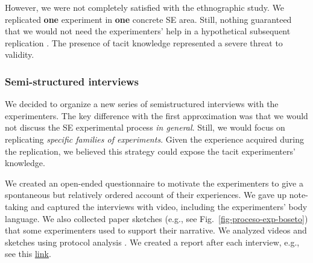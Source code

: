 However, we were not completely satisfied with the ethnographic study. We replicated \textbf{one} experiment in \textbf{one} concrete SE area. Still, nothing guaranteed that we would not need the experimenters' help in a hypothetical subsequent replication \cite{Juristo-2012-replication-SE} \cite{Gomez-2014-understanding-replication}. The presence of tacit knowledge represented a severe threat to validity.

\subsubsection{Semi-structured interviews}
We decided to organize a new series of semistructured interviews with the experimenters. The key difference with the first approximation was that we would not discuss the SE experimental process \textit{in general}. Still, we would focus on replicating \textit{specific families of experiments}. Given the experience acquired during the replication, we believed this strategy could expose the tacit experimenters' knowledge.

We created an open-ended questionnaire to motivate the experimenters to give a spontaneous but relatively ordered account of their experiences. We gave up note-taking and captured the interviews with video, including the experimenters' body language. We also collected paper sketches (e.g., see Fig.~\ref{fig-proceso-exp-boseto}) that some experimenters used to support their narrative. We analyzed videos and sketches using protocol analysis \cite{Pressley-1995-verbal-protocols}. We created a report after each interview, e.g., see this \href{https://zenodo.org/record/7102137#.YytgDOzMLUI}{\ul{link}}.

